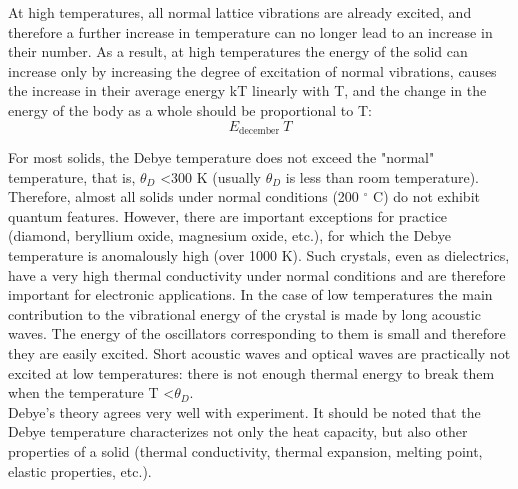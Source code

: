 \documentclass[a4paper,14pt]{extreport}
\begin{document}
At high temperatures, all normal lattice vibrations are already excited, and therefore a further increase in temperature can no longer lead to an increase in their number. As a result, at high temperatures the energy of the solid can increase only by increasing the degree of excitation of normal vibrations, causes the increase in their average energy kT linearly with T, and the change in the energy of the body as a whole should be proportional to T: $$ E _ {\text {december}} ~ T $$

For most solids, the Debye temperature does not exceed the "normal" temperature, that is, $\theta_D $ <300 K (usually $\theta_D $ is less than room temperature). Therefore, almost all solids under normal conditions (200 $ ^ \circ $ C) do not exhibit quantum features. However, there are important exceptions for practice (diamond, beryllium oxide, magnesium oxide, etc.), for which the Debye temperature is anomalously high (over 1000 K). Such crystals, even as dielectrics, have a very high thermal conductivity under normal conditions and are therefore important for electronic applications. In the case of low temperatures the main contribution to the vibrational energy of the crystal is made by long acoustic waves. The energy of the oscillators corresponding to them is small and therefore they are easily excited. Short acoustic waves and optical waves are practically not excited at low temperatures: there is not enough thermal energy to break them when the temperature T <$ \theta_D $.\\

Debye's theory agrees very well with experiment. It should be noted that the Debye temperature characterizes not only the heat capacity, but also other properties of a solid (thermal conductivity, thermal expansion, melting point, elastic properties, etc.).
\end{document}
